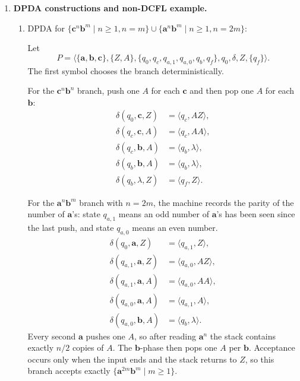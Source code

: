 \begin{enumerate}[{10.}1. ]
\begin{enumerate}
\item \textbf{Proof}: The statement in part~(b) is true. Let
\[
K = \{x\in\{\pmb{a},\pmb{b},\pmb{c}\}^* \mid
|x|_{\pmb{a}}=|x|_{\pmb{b}}=|x|_{\pmb{c}}\}.
\]
Suppose, for contradiction, that $K$ is context free. The language
\[
R=\pmb{a}^+\pmb{b}^+\pmb{c}^+
\]
is regular, so $K\cap R$ would be context free. But
\[
K\cap R=\{\pmb{a}^n\pmb{b}^n\pmb{c}^n\mid n\geq 1\},
\]
which part~(a) proves is not context free. This contradiction proves that $K$
is not context free. \qed
\end{enumerate}

\item \textbf{DPDA constructions and non-DCFL example.}

\begin{enumerate}
\item DPDA for $\{\pmb{c}^n\pmb{b}^m \mid n\geq 1, n=m\} \cup \{\pmb{a}^n\pmb{b}^m \mid n\geq 1, n=2m\}$:

Let
\[
P=\langle\{\pmb{a},\pmb{b},\pmb{c}\},\{Z,A\},
\{q_0,q_c,q_{a,1},q_{a,0},q_b,q_f\},q_0,\delta,Z,\{q_f\}\rangle.
\]
The first symbol chooses the branch deterministically.

For the $\pmb{c}^n\pmb{b}^n$ branch, push one $A$ for each $\pmb{c}$ and then
pop one $A$ for each $\pmb{b}$:
\begin{align*}
\delta(q_0,\pmb{c},Z)&=\langle q_c,AZ\rangle,\\
\delta(q_c,\pmb{c},A)&=\langle q_c,AA\rangle,\\
\delta(q_c,\pmb{b},A)&=\langle q_b,\lambda\rangle,\\
\delta(q_b,\pmb{b},A)&=\langle q_b,\lambda\rangle,\\
\delta(q_b,\lambda,Z)&=\langle q_f,Z\rangle.
\end{align*}

For the $\pmb{a}^n\pmb{b}^m$ branch with $n=2m$, the machine records the parity of the number of $\pmb{a}$'s: state $q_{a,1}$ means an odd number of $\pmb{a}$'s has been seen since the last push, and state $q_{a,0}$ means an even number.
\begin{align*}
\delta(q_0,\pmb{a},Z)&=\langle q_{a,1},Z\rangle,\\
\delta(q_{a,1},\pmb{a},Z)&=\langle q_{a,0},AZ\rangle,\\
\delta(q_{a,1},\pmb{a},A)&=\langle q_{a,0},AA\rangle,\\
\delta(q_{a,0},\pmb{a},A)&=\langle q_{a,1},A\rangle,\\
\delta(q_{a,0},\pmb{b},A)&=\langle q_b,\lambda\rangle.
\end{align*}
Every second $\pmb{a}$ pushes one $A$, so after reading $\pmb{a}^n$ the stack contains exactly $n/2$ copies of $A$. The $\pmb{b}$-phase then pops one $A$ per $\pmb{b}$. Acceptance occurs only when the input ends and the stack returns to $Z$, so this branch accepts exactly $\{\pmb{a}^{2m}\pmb{b}^m\mid m\geq 1\}$.


\end{enumerate}
\end{enumerate}
